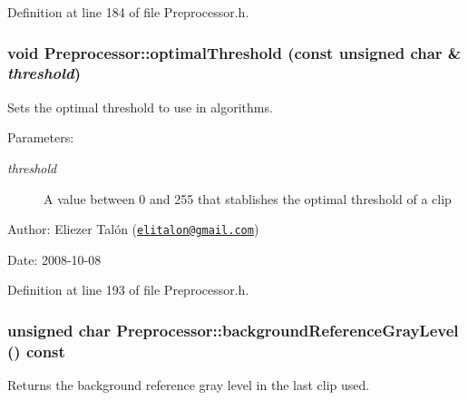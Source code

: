 Definition at line 184 of file Preprocessor.h.\hypertarget{class_preprocessor_1fc44d7d19944f3c3addd3a576c37414}{
\subsubsection[optimalThreshold]{\setlength{\rightskip}{0pt plus 5cm}void Preprocessor::optimalThreshold (const unsigned char \& {\em threshold})}}
\label{class_preprocessor_1fc44d7d19944f3c3addd3a576c37414}


Sets the optimal threshold to use in algorithms. 

\begin{Desc}
\item[Parameters:]
\begin{description}
\item[{\em threshold}]A value between 0 and 255 that stablishes the optimal threshold of a clip\end{description}
\end{Desc}
\begin{Desc}
\item[Author:]Eliezer Talón (\href{mailto:elitalon@gmail.com}{\tt elitalon@gmail.com}) \end{Desc}
\begin{Desc}
\item[Date:]2008-10-08 \end{Desc}


Definition at line 193 of file Preprocessor.h.\hypertarget{class_preprocessor_9a2684181b5f43051fe53d7d2950dd36}{
\subsubsection[backgroundReferenceGrayLevel]{\setlength{\rightskip}{0pt plus 5cm}unsigned char Preprocessor::backgroundReferenceGrayLevel () const}}
\label{class_preprocessor_9a2684181b5f43051fe53d7d2950dd36}


Returns the background reference gray level in the last clip used. 

